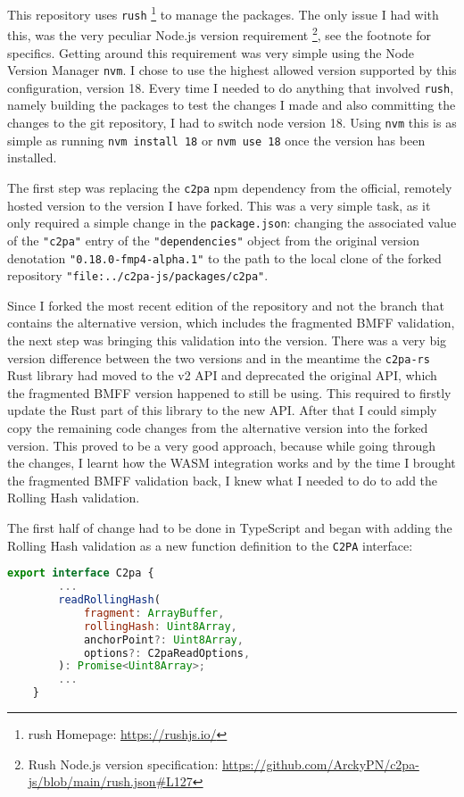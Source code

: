This repository uses \texttt{rush} \footnote{rush Homepage: \url{https://rushjs.io/}} to manage the packages. The only issue I had with this, was the very peculiar Node.js version requirement \footnote{Rush Node.js version specification: \url{https://github.com/ArckyPN/c2pa-js/blob/main/rush.json\#L127}}, see the footnote for specifics. Getting around this requirement was very simple using the Node Version Manager \texttt{nvm}. I chose to use the highest allowed version supported by this configuration, version 18. Every time I needed to do anything that involved \texttt{rush}, namely building the packages to test the changes I made and also committing the changes to the git repository, I had to switch node version 18. Using \texttt{nvm} this is as simple as running \texttt{nvm install 18} or \texttt{nvm use 18} once the version has been installed.

The first step was replacing the \texttt{c2pa} npm dependency from the official, remotely hosted version to the version I have forked. This was a very simple task, as it only required a simple change in the \texttt{package.json}: changing the associated value of the \texttt{"c2pa"} entry of the \texttt{"dependencies"} object from the original version denotation \texttt{"0.18.0-fmp4-alpha.1"} to the path to the local clone of the forked repository \texttt{"file:../c2pa-js/packages/c2pa"}.

Since I forked the most recent edition of the repository and not the branch that contains the alternative version, which includes the fragmented BMFF validation, the next step was bringing this validation into the version. There was a very big version difference between the two versions and in the meantime the \texttt{c2pa-rs} Rust library had moved to the v2 API and deprecated the original API, which the fragmented BMFF version happened to still be using. This required to firstly update the Rust part of this library to the new API. After that I could simply copy the remaining code changes from the alternative version into the forked version. This proved to be a very good approach, because while going through the changes, I learnt how the WASM integration works and by the time I brought the fragmented BMFF validation back, I knew what I needed to do to add the Rolling Hash validation.

The first half of change had to be done in TypeScript and began with adding the Rolling Hash validation as a new function definition to the \texttt{C2PA} interface:

\begin{minipage}{0.95\linewidth}
\begin{lstlisting}[caption={New Rolling Hash Validation Function}, label=code:rh_validate, language=JavaScript, captionpos=b]
    export interface C2pa {
        ...
        readRollingHash(
            fragment: ArrayBuffer,
            rollingHash: Uint8Array,
            anchorPoint?: Uint8Array,
            options?: C2paReadOptions,
        ): Promise<Uint8Array>;
        ...
    }
\end{lstlisting}
\end{minipage}

